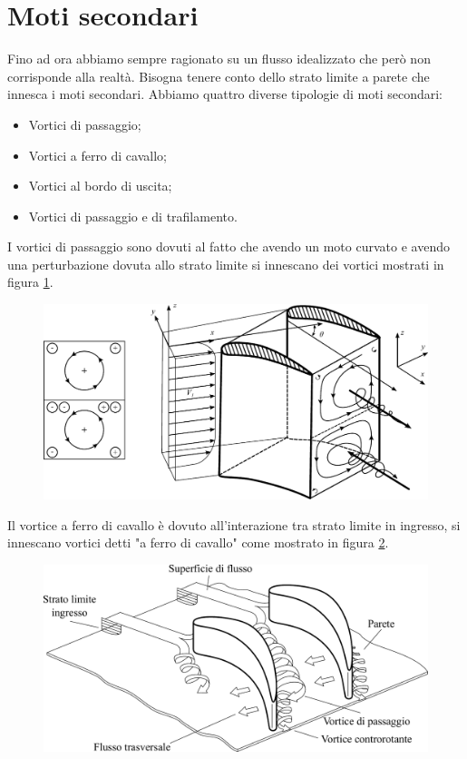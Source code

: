 \section{Moti secondari}
Fino ad ora abbiamo sempre ragionato su un flusso idealizzato che però non corrisponde alla realtà. Bisogna tenere conto dello strato limite a parete che innesca i moti secondari.
Abbiamo quattro diverse tipologie di moti secondari:
\begin{itemize}
\item Vortici di passaggio;
\item Vortici a ferro di cavallo;
\item Vortici al bordo di uscita;
\item Vortici di passaggio e di trafilamento.
\end{itemize}
I vortici di passaggio sono dovuti al fatto che avendo un moto curvato e avendo una perturbazione dovuta allo strato limite si innescano dei vortici mostrati in figura \ref{fig:VortPass}.
\begin{figure}[h!]
\centering
  \includegraphics[width=.8\textwidth]{fig/VortPass.pdf}
\caption{}
\label{fig:VortPass}
\end{figure}
Il vortice a ferro di cavallo è dovuto all'interazione tra strato limite in ingresso, si innescano vortici detti "a ferro di cavallo" come mostrato in figura \ref{fd:VortFerrCav}.
\begin{figure}[h!]
\centering
  \includegraphics[width=.8\textwidth]{fig/VortFerrCav.pdf}
\caption{}
\label{fd:VortFerrCav}
\end{figure}
